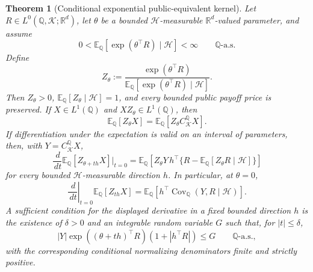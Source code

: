 \documentclass[11pt,a4paper]{amsart}
\theoremstyle{plain}
\newtheorem{theorem}{Theorem}[section]
\theoremstyle{definition}
\theoremstyle{remark}
\DeclareMathOperator{\Cov}{Cov}
\newcommand{\R}{\mathbb{R}}
\newcommand{\QQ}{\mathbb{Q}}
\newcommand{\EE}{\mathbb{E}}
\newcommand{\cH}{\mathcal{H}}
\newcommand{\cK}{\mathcal{K}}
\newcommand{\dd}{\,d}
\begin{document}
\begin{theorem}[Conditional exponential public-equivalent kernel]\label{thm:conditional-exponential-kernel}
Let \(R\in L^0(\QQ,\cK;\R^d)\), let \(\theta\) be a bounded \(\cH\)-measurable
\(\R^d\)-valued parameter, and assume
\[
        0<
        \EE_\QQ[\exp(\theta^\top R)\mid\cH]
        <
        \infty
        \qquad\QQ\text{-a.s.}
\]
Define
\[
        Z_\theta
        :=
        \frac{\exp(\theta^\top R)}
        {\EE_\QQ[\exp(\theta^\top R)\mid\cH]}.
\]
Then \(Z_\theta>0\), \(\EE_\QQ[Z_\theta\mid\cH]=1\), and every bounded public payoff price is
preserved.  If \(X\in L^1(\QQ)\) and \(XZ_\theta\in L^1(\QQ)\), then
\[
        \EE_\QQ[Z_\theta X]
        =
        \EE_\QQ[Z_\theta C_{\cK}^{\QQ}X].
\]
If differentiation under the expectation is valid on an interval of parameters, then, with
\(Y=C_{\cK}^{\QQ}X\),
\[
        \frac{\dd}{\dd t}\EE_\QQ[Z_{\theta+t h}X]\bigg|_{t=0}
        =
        \EE_\QQ\!\left[
        Z_\theta Y\,
        h^\top\{R-\EE_\QQ[Z_\theta R\mid\cH]\}
        \right]
\]
for every bounded \(\cH\)-measurable direction \(h\).  In particular, at \(\theta=0\),
\[
        \left.\frac{\dd}{\dd t}\right|_{t=0}
        \EE_\QQ[Z_{t h}X]
        =
        \EE_\QQ\!\left[h^\top\Cov_\QQ(Y,R\mid\cH)\right].
\]
A sufficient condition for the displayed derivative in a fixed bounded direction \(h\) is the
existence of \(\delta>0\) and an integrable random variable \(G\) such that, for
\(|t|\le\delta\),
\[
        |Y|\exp((\theta+t h)^\top R)(1+|h^\top R|)
        \le G
        \qquad\QQ\text{-a.s.},
\]
with the corresponding conditional normalizing denominators finite and strictly positive.
\end{theorem}
\end{document}
